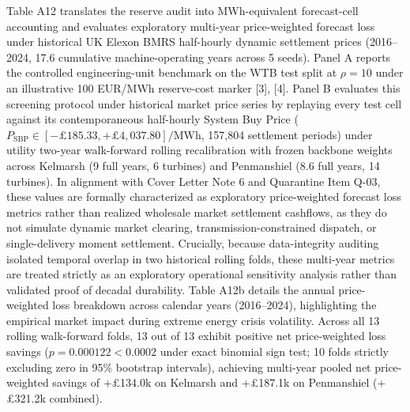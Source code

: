 \documentclass[
  journal]{IEEEtran}
\begin{document}
Table A12 translates the reserve audit into MWh-equivalent forecast-cell
accounting and evaluates exploratory multi-year price-weighted forecast
loss under historical UK Elexon BMRS half-hourly dynamic settlement
prices (2016--2024, 17.6 cumulative machine-operating years across 5
seeds). Panel A reports the controlled engineering-unit benchmark on the
WTB test split at \(\rho=10\) under an illustrative 100 EUR/MWh
reserve-cost marker {[}3{]}, {[}4{]}. Panel B evaluates this screening
protocol under historical market price series by replaying every test
cell against its contemporaneous half-hourly System Buy Price
(\(P_{\mathrm{SBP}} \in [-£185.33, +£4,037.80]/\text{MWh}\), 157,804
settlement periods) under utility two-year walk-forward rolling
recalibration with frozen backbone weights across Kelmarsh (9 full
years, 6 turbines) and Penmanshiel (8.6 full years, 14 turbines). In
alignment with Cover Letter Note 6 and Quarantine Item Q-03, these
values are formally characterized as exploratory price-weighted forecast
loss metrics rather than realized wholesale market settlement cashflows,
as they do not simulate dynamic market clearing,
transmission-constrained dispatch, or single-delivery moment settlement.
Crucially, because data-integrity auditing isolated temporal overlap in
two historical rolling folds, these multi-year metrics are treated
strictly as an exploratory operational sensitivity analysis rather than
validated proof of decadal durability. Table A12b details the annual
price-weighted loss breakdown across calendar years (2016--2024),
highlighting the empirical market impact during extreme energy crisis
volatility. Across all 13 rolling walk-forward folds, 13 out of 13
exhibit positive net price-weighted loss savings
(\(p = 0.000122 < 0.0002\) under exact binomial sign test; 10 folds
strictly excluding zero in 95\% bootstrap intervals), achieving
multi-year pooled net price-weighted savings of +£134.0k on Kelmarsh and
+£187.1k on Penmanshiel (+£321.2k combined).
\end{document}
